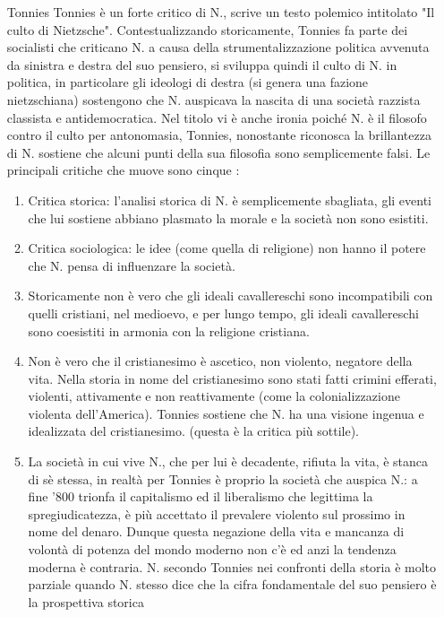 \documentclass[10pt,a4paper]{article}
\begin{document}
\begin{itemize}
\item[Tonnies] Tonnies è un forte critico di N., scrive un testo polemico intitolato "Il culto di Nietzsche". Contestualizzando storicamente, Tonnies fa parte dei socialisti che criticano N. a causa della strumentalizzazione politica avvenuta da sinistra e destra del suo pensiero, si sviluppa quindi il culto di N. in politica, in particolare gli ideologi di destra (si genera una fazione nietzschiana) sostengono che N. auspicava la nascita di una società razzista classista e antidemocratica. Nel titolo vi è anche ironia poiché N. è il filosofo contro il culto per antonomasia, Tonnies, nonostante riconosca la brillantezza di N. sostiene che alcuni punti della sua filosofia sono semplicemente falsi. Le principali critiche che muove sono cinque :
	\begin{enumerate}
		\item Critica storica: l'analisi storica di N. è semplicemente sbagliata, gli eventi che lui sostiene abbiano plasmato la morale e la società non sono esistiti.
		\item Critica sociologica: le idee (come quella di religione) non hanno il potere che N. pensa di influenzare la società.
		\item Storicamente non è vero che gli ideali cavallereschi sono incompatibili con quelli cristiani, nel medioevo, e per lungo tempo, gli ideali cavallereschi sono coesistiti in armonia con la religione cristiana.
		\item Non è vero che il cristianesimo è ascetico, non violento, negatore della vita. Nella storia in nome del cristianesimo sono stati fatti crimini efferati, violenti, attivamente e non reattivamente (come la colonializzazione violenta dell'America). Tonnies sostiene che N. ha una visione ingenua e idealizzata del cristianesimo. (questa è la critica più sottile).
		\item La società in cui vive N., che per lui è decadente, rifiuta la vita, è stanca di sè stessa, in realtà per Tonnies è proprio la società che auspica N.: a fine '800 trionfa il capitalismo ed il liberalismo che legittima la spregiudicatezza, è più accettato il prevalere violento sul prossimo in nome del denaro. Dunque questa negazione della vita e mancanza di volontà di potenza del mondo moderno non c'è ed anzi la tendenza moderna è contraria. N. secondo Tonnies nei confronti della storia è molto parziale quando N. stesso dice che la cifra fondamentale del suo pensiero è la prospettiva storica
	\end{enumerate}

\end{itemize}
\end{document}

